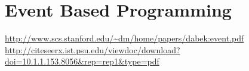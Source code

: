 \section{Event Based Programming}
\label{section:EventBasedProgramming}

\url{http://www.scs.stanford.edu/~dm/home/papers/dabek:event.pdf}
\url{http://citeseerx.ist.psu.edu/viewdoc/download?doi=10.1.1.153.8056&rep=rep1&type=pdf}